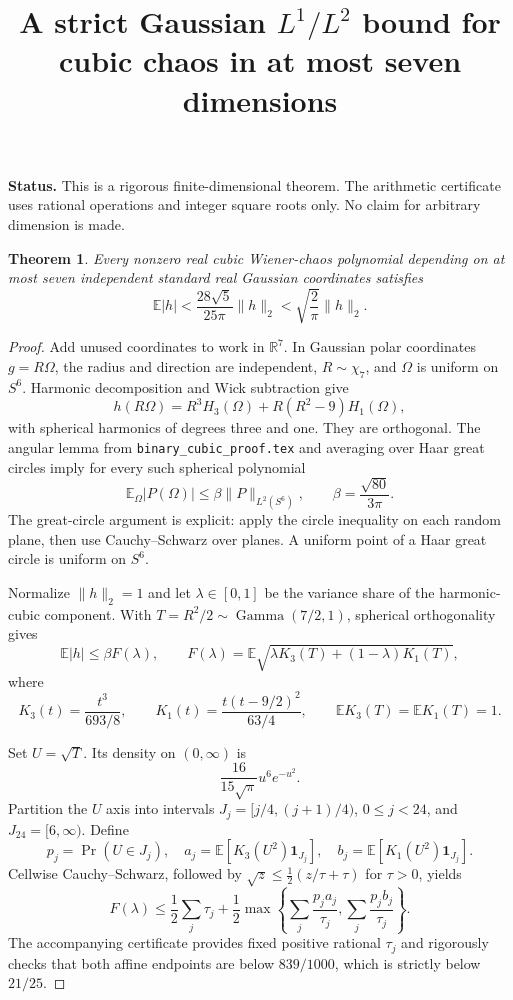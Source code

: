 \documentclass[11pt]{article}
\title{A strict Gaussian $L^1/L^2$ bound for cubic chaos in at most seven dimensions}
\author{}
\date{}
\newtheorem{theorem}{Theorem}
\newcommand{\E}{\mathbb E}
\begin{document}
\maketitle
\noindent\textbf{Status.} This is a rigorous finite-dimensional theorem.
The arithmetic certificate uses rational operations and integer square roots
only. No claim for arbitrary dimension is made.

\begin{theorem}
Every nonzero real cubic Wiener-chaos polynomial depending on at most seven
independent standard real Gaussian coordinates satisfies
\[
 \boxed{\E|h|<\frac{28\sqrt5}{25\pi}\|h\|_2
       <\sqrt{\frac2\pi}\|h\|_2.}
\]
\end{theorem}

\begin{proof}
Add unused coordinates to work in $\mathbb R^7$. In Gaussian polar
coordinates $g=R\Omega$, the radius and direction are independent,
$R\sim\chi_7$, and $\Omega$ is uniform on $S^6$. Harmonic decomposition
and Wick subtraction give
\[
 h(R\Omega)=R^3H_3(\Omega)+R(R^2-9)H_1(\Omega),
\]
with spherical harmonics of degrees three and one. They are orthogonal.
The angular lemma from \texttt{binary\_cubic\_proof.tex} and averaging over
Haar great circles imply for every such spherical polynomial
\[
 \E_\Omega|P(\Omega)|\leq\beta\|P\|_{L^2(S^6)},
 \qquad \beta=\frac{\sqrt{80}}{3\pi}.
\]
The great-circle argument is explicit: apply the circle inequality on each
random plane, then use Cauchy--Schwarz over planes. A uniform point of a
Haar great circle is uniform on $S^6$.

Normalize $\|h\|_2=1$ and let $\lambda\in[0,1]$ be the variance share of
the harmonic-cubic component. With $T=R^2/2\sim\operatorname{Gamma}(7/2,1)$,
spherical orthogonality gives
\[
 \E|h|\leq\beta F(\lambda),\qquad
 F(\lambda)=\E\sqrt{\lambda K_3(T)+(1-\lambda)K_1(T)},
\]
where
\[
 K_3(t)=\frac{t^3}{693/8},\qquad
 K_1(t)=\frac{t(t-9/2)^2}{63/4},\qquad
 \E K_3(T)=\E K_1(T)=1.
\]

Set $U=\sqrt T$. Its density on $(0,\infty)$ is
\[
 \frac{16}{15\sqrt\pi}u^6e^{-u^2}.
\]
Partition the $U$ axis into intervals
$J_j=[j/4,(j+1)/4)$, $0\leq j<24$, and $J_{24}=[6,\infty)$.
Define
\[
 p_j=\Pr(U\in J_j),\quad
 a_j=\E[K_3(U^2)\mathbf1_{J_j}],\quad
 b_j=\E[K_1(U^2)\mathbf1_{J_j}].
\]
Cellwise Cauchy--Schwarz, followed by
$\sqrt z\leq\frac12(z/\tau+\tau)$ for $\tau>0$, yields
\[
 F(\lambda)\leq\frac12\sum_j\tau_j+
 \frac12\max\left\{\sum_j\frac{p_ja_j}{\tau_j},
                       \sum_j\frac{p_jb_j}{\tau_j}\right\}.
\]
The accompanying certificate provides fixed positive rational $\tau_j$
and rigorously checks that both affine endpoints are below $839/1000$,
which is strictly below $21/25$.


\end{proof}
\end{document}
